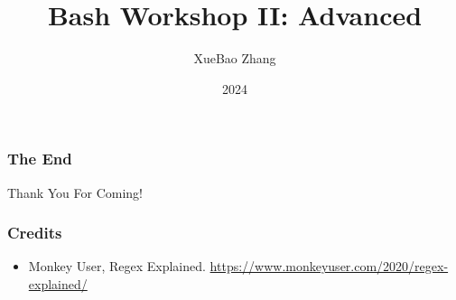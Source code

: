 \documentclass{beamer}
\title{Bash Workshop II: Advanced}
\author{XueBao Zhang}
\institute{JITech}
\date{2024}
\begin{document}
\frame{\titlepage}




\begin{frame}
\frametitle{The End}
\vspace{1cm}
\centering \Huge {Thank You For Coming!}
\end{frame}

\begin{frame}
\frametitle{Credits}
\begin{itemize}
    \item Monkey User, Regex Explained.
        \url{https://www.monkeyuser.com/2020/regex-explained/}
\end{itemize}
\end{frame}
\end{document}
